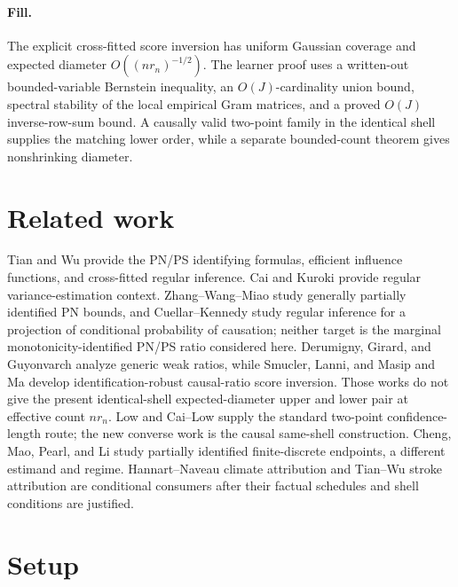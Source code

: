 \documentclass{article}
\begin{document}
\paragraph{Fill.} The explicit cross-fitted score inversion has uniform Gaussian coverage and expected diameter \(O((nr_n)^{-1/2})\). The learner proof uses a written-out bounded-variable Bernstein inequality, an \(O(J)\)-cardinality union bound, spectral stability of the local empirical Gram matrices, and a proved \(O(J)\) inverse-row-sum bound. A causally valid two-point family in the identical shell supplies the matching lower order, while a separate bounded-count theorem gives nonshrinking diameter.

\section{Related work}

Tian and Wu provide the PN/PS identifying formulas, efficient influence functions, and cross-fitted regular inference. Cai and Kuroki provide regular variance-estimation context. Zhang--Wang--Miao study generally partially identified PN bounds, and Cuellar--Kennedy study regular inference for a projection of conditional probability of causation; neither target is the marginal monotonicity-identified PN/PS ratio considered here. Derumigny, Girard, and Guyonvarch analyze generic weak ratios, while Smucler, Lanni, and Masip and Ma develop identification-robust causal-ratio score inversion. Those works do not give the present identical-shell expected-diameter upper and lower pair at effective count \(nr_n\). Low and Cai--Low supply the standard two-point confidence-length route; the new converse work is the causal same-shell construction. Cheng, Mao, Pearl, and Li study partially identified finite-discrete endpoints, a different estimand and regime. Hannart--Naveau climate attribution and Tian--Wu stroke attribution are conditional consumers after their factual schedules and shell conditions are justified.

\section{Setup}
\end{document}
